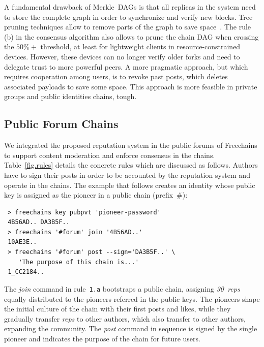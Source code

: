 \documentclass[10pt,journal,compsoc]{IEEEtran}
\newcommand{\FC}       {Freechains\xspace}
\newcommand{\reps}     {\emph{reps}\xspace}
\newcommand{\nreps}[1] {\emph{#1~reps\xspace}}
\begin{document}
A fundamental drawback of Merkle~DAGs is that all replicas in the system need
to store the complete graph in order to synchronize and verify new blocks.
Tree pruning techniques allow to remove parts of the graph to save
space~\cite{p2p.prune}.
The rule (b) in the consensus algorithm also allows to prune the chain DAG when
crossing the $50\%+$ threshold, at least for lightweight clients in
resource-constrained devices.
However, these devices can no longer verify older forks and need to delegate
trust to more powerful peers.
%
A more pragmatic approach, but which requires cooperation among users, is to
revoke past posts, which deletes associated payloads to save some space.
This approach is more feasible in private groups and public identities chains,
tough.

\subsection{Public Forum Chains}
\label{sec.consensus.chains}

We integrated the proposed reputation system in the public forums of \FC to
support content moderation and enforce consensus in the chains.
Table~\ref{fig.rules} details the concrete rules which are discussed as
follows.
Authors have to sign their posts in order to be accounted by the reputation
system and operate in the chains.
The example that follows creates an identity whose public key is assigned as
the pioneer in a public chain (prefix~$\#$):

{\footnotesize
\begin{verbatim}
 > freechains key pubpvt 'pioneer-password'
 4B56AD.. DA3B5F..
 > freechains '#forum' join '4B56AD..'
 10AE3E..
 > freechains '#forum' post --sign='DA3B5F..' \
    'The purpose of this chain is...'
 1_CC2184..
\end{verbatim}
}

The \emph{join} command in rule~\texttt{1.a} bootstraps a public chain,
assigning \nreps{30} equally distributed to the pioneers referred in the public
keys.
The pioneers shape the initial culture of the chain with their first posts and
likes, while they gradually transfer \reps to other authors, which also
transfer to other authors, expanding the community.
%
The \emph{post} command in sequence is signed by the single pioneer and
indicates the purpose of the chain for future users.
\end{document}
